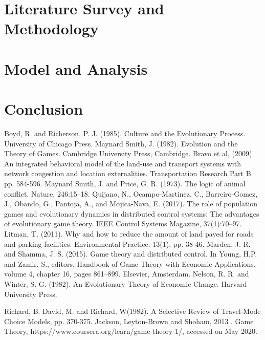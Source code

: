 \documentclass[12pt]{report}
\begin{document}
\chapter{Literature Survey and Methodology} 


\chapter{Model and Analysis}


\chapter*{Conclusion}


\begin{thebibliography}{2}
Boyd, R. and Richerson, P. J. (1985). Culture and the Evolutionary Process. University of Chicago Press.
Maynard Smith, J. (1982). Evolution and the Theory of Games. Cambridge University Press, Cambridge.
Bravo et al, (2009) An integrated behavioral model of the land-use and transport systems with network congestion and location externalities. Transportation Research Part B. pp. 584-596.
Maynard Smith, J. and Price, G. R. (1973). The logic of animal conflict. Nature, 246:15–18. 
Quijano, N., Ocampo-Martinez, C., Barreiro-Gomez, J., Obando, G., Pantoja, A., and Mojica-Nava, E. (2017). The role of population games and evolutionary dynamics in distributed control systems: The advantages of evolutionary game theory. IEEE Control Systems Magazine, 37(1):70–97.
Litman, T. (2011). Why and how to reduce the amount of land paved for roads
and parking facilities. Environmental Practice. 13(1), pp. 38-46.
Marden, J. R. and Shamma, J. S. (2015). Game theory and distributed control. In Young, H.P. and Zamir, S., editors, Handbook of Game Theory with Economic Applications, volume 4, chapter 16, pages 861–899. Elsevier, Amsterdam.
Nelson, R. R. and Winter, S. G. (1982). An Evolutionary Theory of Economic Change. Harvard University Press.

Richard, B. David, M. and Richard, W(1982). A Selective Review of Travel-Mode Choice Models, pp. 370-375.
Jackson, Leyton-Brown and Shoham, 2013 . Game Theory, https://www.coursera.org/learn/game-theory-1/, accessed on May 2020. 


\end{thebibliography}
\end{document}
